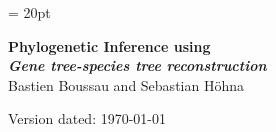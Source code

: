 \documentclass[11pt]{article}
\begin{document}
\renewcommand{\headrulewidth}{0.5pt}
\headsep = 20pt
\lhead{ }

\thispagestyle{plain}
\begin{center}

\textbf{\LARGE Phylogenetic Inference using \RevBayes}\\\vspace{2mm}
\textbf{\it{\Large Gene tree-species tree reconstruction}}\\\vspace{2mm}
\vspace{1cm}
{\Large Bastien Boussau and Sebastian H{\"o}hna}
\vspace{1cm}
\end{center}

\def \ResourcePath {./}
\def \GlobalResourcePath {../}


Version dated: \today
\end{document}
